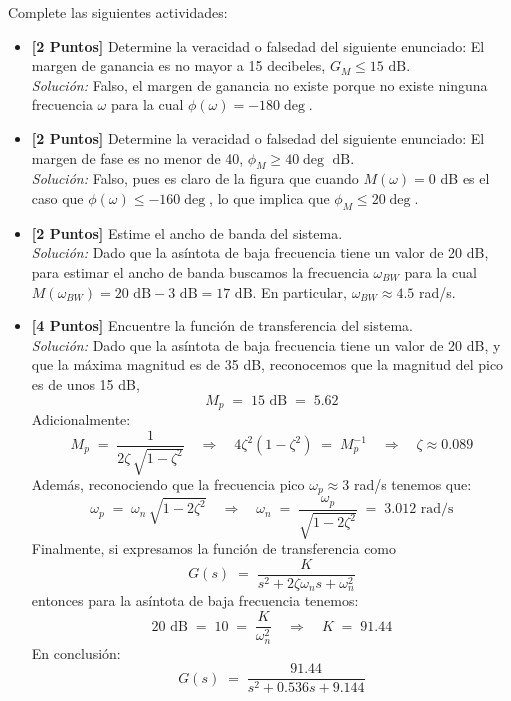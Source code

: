 \documentclass[ a4paper, twoside, 11pt]{article}
\begin{document}
\begin{problem}
Complete las siguientes actividades: 
\begin{itemize}
\item \textbf{[2 Puntos]} Determine la veracidad o falsedad del siguiente enunciado: El margen de ganancia es no mayor a 15 decibeles, \ie $G_M \leq 15 \text{ dB}$. \\ \emph{Soluci\'on:} Falso, el margen de ganancia no existe porque no existe ninguna frecuencia $\omega$ para la cual $\phi(\omega) = -180\deg$. 
\item \textbf{[2 Puntos]} Determine la veracidad o falsedad del siguiente enunciado: El margen de fase es no menor de 40\deg, \ie $\phi_M \geq 40\deg \text{ dB}$. \\ \emph{Soluci\'on:} Falso, pues es claro de la figura que cuando $M(\omega) = 0$ dB es el caso que $\phi(\omega) \leq -160\deg$, lo que implica que $\phi_M \leq 20\deg$. 
\item \textbf{[2 Puntos]} Estime el ancho de banda del sistema. \\ \emph{Soluci\'on:} Dado que la as\'intota de baja frecuencia tiene un valor de 20 dB, para estimar el ancho de banda buscamos la frecuencia $\omega_{BW}$ para la cual $M(\omega_{BW}) = 20 \text{ dB} - 3 \text{ dB} = 17 \text{ dB}$. En particular, $\omega_{BW} \approx 4.5$ rad/s. 
\item \textbf{[4 Puntos]} Encuentre la funci\'on de transferencia del sistema. \\ \emph{Soluci\'on:} Dado que la as\'intota de baja frecuencia tiene un valor de 20 dB, y que la m\'axima magnitud es de 35 dB, reconocemos que la magnitud del pico es de unos 15 dB, \iec
\[
M_p \; = \; 15 \text{ dB} \; = \; 5.62
\]
Adicionalmente: 
\[
M_p \; = \; \frac{1}{ 2 \zeta \, \sqrt{1 - \zeta^2}}
\quad \Longrightarrow \quad
4 \zeta^2 ( 1 - \zeta^2 ) \; = \; M_p^{-1}
\quad \Longrightarrow \quad
\zeta \approx 0.089
\]
Adem\'as, reconociendo que la frecuencia pico $\omega_p \approx 3$ rad/s tenemos que: 
\[
\omega_p \; = \; \omega_n \, \sqrt{1 - 2 \zeta^2}
\quad \Longrightarrow \quad
\omega_n \; = \; \frac{\omega_p}{\sqrt{1 - 2 \zeta^2}}
\; = \; 3.012 \text{ rad/s}
\]
Finalmente, si expresamos la funci\'on de transferencia como
\[
G(s) \; = \; \frac{K}{s^2 + 2 \zeta \omega_n s + \omega_n^2}
\]
entonces para la as\'intota de baja frecuencia tenemos: 
\[
20 \text{ dB} \; = \; 10 \; = \; \frac{K}{\omega_n^2}
\quad \Longrightarrow \quad
K \; = \; 91.44
\]
En conclusi\'on: 
\[
G(s) \; = \; \frac{91.44}{s^2 + 0.536 s + 9.144}
\]

\end{itemize}

\end{problem}
\vspace{\baselineskip}
\end{document}
